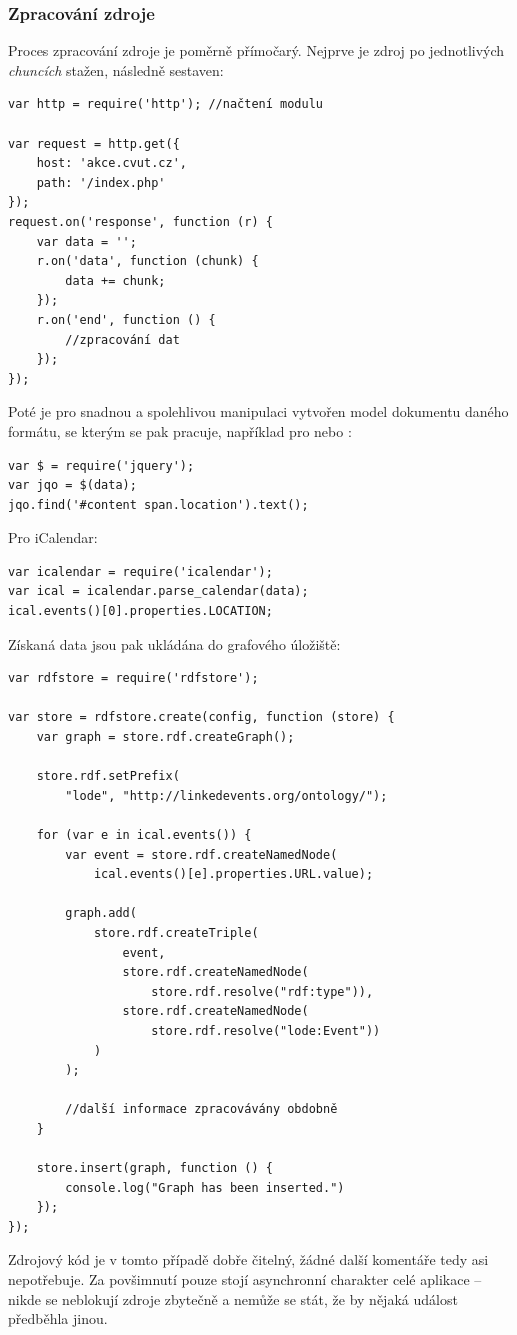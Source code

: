 \subsubsection{Zpracování zdroje}
Proces zpracování zdroje je poměrně přímočarý. Nejprve je zdroj po jednotlivých \textit{chuncích} stažen, následně sestaven:
\begin{verbatim}
var http = require('http'); //načtení modulu

var request = http.get({
    host: 'akce.cvut.cz',
    path: '/index.php'
});
request.on('response', function (r) {
    var data = '';
    r.on('data', function (chunk) {
        data += chunk;
    });
    r.on('end', function () {
        //zpracování dat
    });
});
\end{verbatim}
Poté je pro snadnou a spolehlivou manipulaci vytvořen model dokumentu daného formátu, se kterým se pak pracuje, například pro  nebo :
\begin{verbatim}
var $ = require('jquery');
var jqo = $(data);
jqo.find('#content span.location').text();
\end{verbatim}
Pro iCalendar:
\begin{verbatim}
var icalendar = require('icalendar');
var ical = icalendar.parse_calendar(data);
ical.events()[0].properties.LOCATION;
\end{verbatim}
Získaná data jsou pak ukládána do grafového úložiště:
\begin{verbatim}
var rdfstore = require('rdfstore');

var store = rdfstore.create(config, function (store) {
    var graph = store.rdf.createGraph();

    store.rdf.setPrefix(
        "lode", "http://linkedevents.org/ontology/");

    for (var e in ical.events()) {
        var event = store.rdf.createNamedNode(
            ical.events()[e].properties.URL.value);

        graph.add(
            store.rdf.createTriple(
                event,
                store.rdf.createNamedNode(
                    store.rdf.resolve("rdf:type")),
                store.rdf.createNamedNode(
                    store.rdf.resolve("lode:Event"))
            )
        );

        //další informace zpracovávány obdobně
    }

    store.insert(graph, function () {
        console.log("Graph has been inserted.")
    });
});
\end{verbatim}
Zdrojový kód je v tomto případě dobře čitelný, žádné další komentáře tedy asi nepotřebuje. Za povšimnutí pouze stojí asynchronní charakter celé aplikace -- nikde se neblokují zdroje zbytečně a nemůže se stát, že by nějaká událost předběhla jinou.

